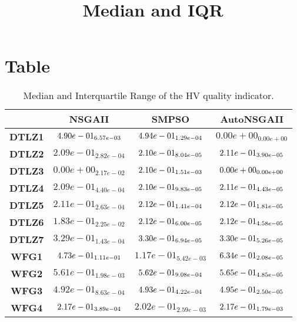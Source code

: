 \documentclass{article}
\title{Median and IQR}
\author{}
\begin{document}
\maketitle
\section{Table}
\begin{table}[!htp]
  \caption{Median and Interquartile Range of the HV quality indicator.}
  \label{table:HV}
  \centering
  \begin{scriptsize}
  \begin{tabular}{c|ccc}
      & \textbf{NSGAII} & \textbf{SMPSO} & \textbf{AutoNSGAII} \\\hline
      \textbf{DTLZ1} & $\cellcolor{gray25} 4.90e-01_{6.57e-03} $ & $ \cellcolor{gray95} 4.94e-01_{1.29e-04} $ & $ 0.00e+00_{0.00e+00}$ \\
      \textbf{DTLZ2} & $2.09e-01_{2.82e-04} $ & $ \cellcolor{gray25} 2.10e-01_{8.04e-05} $ & $ \cellcolor{gray95} 2.11e-01_{3.90e-05}$ \\
      \textbf{DTLZ3} & $0.00e+00_{2.17e-02} $ & $ \cellcolor{gray95} 2.10e-01_{1.51e-03} $ & $ \cellcolor{gray25} 0.00e+00_{0.00e+00}$ \\
      \textbf{DTLZ4} & $2.09e-01_{4.40e-04} $ & $ \cellcolor{gray25} 2.10e-01_{9.83e-05} $ & $ \cellcolor{gray95} 2.11e-01_{4.43e-05}$ \\
      \textbf{DTLZ5} & $2.11e-01_{2.63e-04} $ & $ \cellcolor{gray25} 2.12e-01_{1.41e-04} $ & $ \cellcolor{gray95} 2.12e-01_{1.81e-05}$ \\
      \textbf{DTLZ6} & $1.83e-01_{2.25e-02} $ & $ \cellcolor{gray25} 2.12e-01_{6.00e-05} $ & $ \cellcolor{gray95} 2.12e-01_{4.58e-05}$ \\
      \textbf{DTLZ7} & $3.29e-01_{1.43e-04} $ & $ \cellcolor{gray25} 3.30e-01_{6.94e-05} $ & $ \cellcolor{gray95} 3.30e-01_{5.26e-05}$ \\
      \textbf{WFG1} & $\cellcolor{gray25} 4.73e-01_{1.11e-01} $ & $ 1.17e-01_{5.42e-03} $ & $ \cellcolor{gray95} 6.34e-01_{2.08e-05}$ \\
      \textbf{WFG2} & $5.61e-01_{1.98e-03} $ & $ \cellcolor{gray25} 5.62e-01_{9.08e-04} $ & $ \cellcolor{gray95} 5.65e-01_{4.85e-05}$ \\
      \textbf{WFG3} & $4.92e-01_{8.63e-04} $ & $ \cellcolor{gray25} 4.93e-01_{4.22e-04} $ & $ \cellcolor{gray95} 4.95e-01_{2.50e-05}$ \\
      \textbf{WFG4} & $\cellcolor{gray25} 2.17e-01_{3.89e-04} $ & $ 2.02e-01_{2.59e-03} $ & $ \cellcolor{gray95} 2.17e-01_{1.79e-03}$ \\

\end{tabular}
\end{scriptsize}
\end{table}
\end{document}

